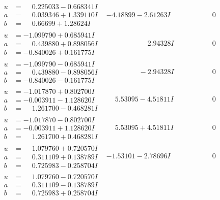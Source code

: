 \documentclass[1p]{elsarticle_modified}
\theoremstyle{definition}
\begin{document}
$$\begin{array}{c|c|c}
\begin{aligned}
u &= \phantom{-}0.225033 - 0.668341 I \\
a &= \phantom{-}0.039346 + 1.339110 I \\
b &= \phantom{-}0.66699 + 1.28624 I\end{aligned}
 & -4.18899 - 2.61263 I & \phantom{-0.000000 } 0 \\ \hline\begin{aligned}
u &= -1.099790 + 0.685941 I \\
a &= \phantom{-}0.439880 + 0.898056 I \\
b &= -0.840026 + 0.161775 I\end{aligned}
 & \phantom{-0.000000 -}2.94328 I & \phantom{-0.000000 } 0 \\ \hline\begin{aligned}
u &= -1.099790 - 0.685941 I \\
a &= \phantom{-}0.439880 - 0.898056 I \\
b &= -0.840026 - 0.161775 I\end{aligned}
 & \phantom{-0.000000 } -2.94328 I & \phantom{-0.000000 } 0 \\ \hline\begin{aligned}
u &= -1.017870 + 0.802700 I \\
a &= -0.003911 - 1.128620 I \\
b &= \phantom{-}1.261700 - 0.468281 I\end{aligned}
 & \phantom{-}5.53095 - 4.51811 I & \phantom{-0.000000 } 0 \\ \hline\begin{aligned}
u &= -1.017870 - 0.802700 I \\
a &= -0.003911 + 1.128620 I \\
b &= \phantom{-}1.261700 + 0.468281 I\end{aligned}
 & \phantom{-}5.53095 + 4.51811 I & \phantom{-0.000000 } 0 \\ \hline\begin{aligned}
u &= \phantom{-}1.079760 + 0.720570 I \\
a &= \phantom{-}0.311109 + 0.138789 I \\
b &= \phantom{-}0.725983 - 0.258704 I\end{aligned}
 & -1.53101 - 2.78696 I & \phantom{-0.000000 } 0 \\ \hline\begin{aligned}
u &= \phantom{-}1.079760 - 0.720570 I \\
a &= \phantom{-}0.311109 - 0.138789 I \\
b &= \phantom{-}0.725983 + 0.258704 I\end{aligned}

\end{array}$$
\end{document}

